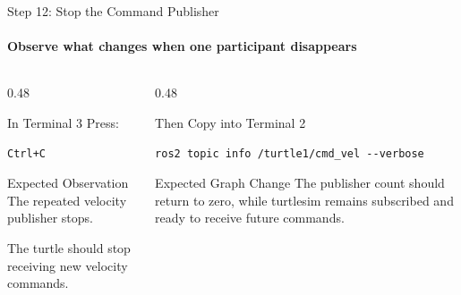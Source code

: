 \begin{frame}[fragile]{Step 12: Stop the Command Publisher}
\framesubtitle{Observe what changes when one participant disappears}

\footnotesize

\begin{columns}[T,onlytextwidth]

    \begin{column}{0.48\textwidth}
        \begin{block}{In Terminal 3}
            Press:

\begin{verbatim}
Ctrl+C
\end{verbatim}
        \end{block}

        \begin{exampleblock}{Expected Observation}
            The repeated velocity publisher stops.

            \vspace{0.15cm}
            The turtle should stop receiving new velocity commands.
        \end{exampleblock}
    \end{column}

    \begin{column}{0.48\textwidth}
        \begin{block}{Then Copy into Terminal 2}
\begin{verbatim}
ros2 topic info /turtle1/cmd_vel --verbose
\end{verbatim}
        \end{block}

        \vspace{0.15cm}

        \begin{alertblock}{Expected Graph Change}
            The publisher count should return to zero, while turtlesim remains
            subscribed and ready to receive future commands.
        \end{alertblock}
    \end{column}

\end{columns}

\end{frame}

